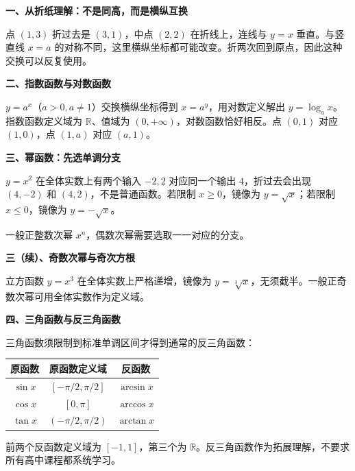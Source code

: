 \clearpage
\begin{explanationbox}
\textbf{\textcolor{CExplanation}{一、从折纸理解：不是同高，而是横纵互换}}


点 $(1,3)$ 折过去是 $(3,1)$，中点 $(2,2)$ 在折线上，连线与 $y=x$ 垂直。与竖直线 $x=a$ 的对称不同，这里横纵坐标都可能改变。折两次回到原点，因此这种交换可以反复使用。
\end{explanationbox}
\clearpage
\begin{explanationbox}
\textbf{\textcolor{CExplanation}{二、指数函数与对数函数}}


$y=a^x$（$a>0,a\ne1$）交换横纵坐标得到 $x=a^y$，用对数定义解出 $y=\log_a x$。指数函数定义域为 $\mathbb R$、值域为 $(0,+\infty)$，对数函数恰好相反。点 $(0,1)$ 对应 $(1,0)$，点 $(1,a)$ 对应 $(a,1)$。
\end{explanationbox}
\clearpage
\begin{explanationbox}
\textbf{\textcolor{CExplanation}{三、幂函数：先选单调分支}}


$y=x^2$ 在全体实数上有两个输入 $-2,2$ 对应同一个输出 $4$，折过去会出现 $(4,-2)$ 和 $(4,2)$，不是普通函数。若限制 $x\ge0$，镜像为 $y=\sqrt{x}$；若限制 $x\le0$，镜像为 $y=-\sqrt{x}$。

一般正整数次幂 $x^n$，偶数次幂需要选取一一对应的分支。
\end{explanationbox}
\clearpage
\begin{explanationbox}
\textbf{\textcolor{CExplanation}{三（续）、奇数次幂与奇次方根}}


立方函数 $y=x^3$ 在全体实数上严格递增，镜像为 $y=\sqrt[3]{x}$，无须截半。一般正奇数次幂可用全体实数作为定义域。
\end{explanationbox}
\clearpage
\begin{explanationbox}
\textbf{\textcolor{CExplanation}{四、三角函数与反三角函数}}


三角函数须限制到标准单调区间才得到通常的反三角函数：
\begin{center}\renewcommand{\arraystretch}{1.5}
\begin{tabular}{c|c|c}
原函数 & 原函数定义域 & 反函数\\\hline
$\sin x$ & $[-\pi/2,\pi/2]$ & $\arcsin x$\\
$\cos x$ & $[0,\pi]$ & $\arccos x$\\
$\tan x$ & $(-\pi/2,\pi/2)$ & $\arctan x$
\end{tabular}\end{center}
前两个反函数定义域为 $[-1,1]$，第三个为 $\mathbb R$。反三角函数作为拓展理解，不要求所有高中课程都系统学习。
\end{explanationbox}
